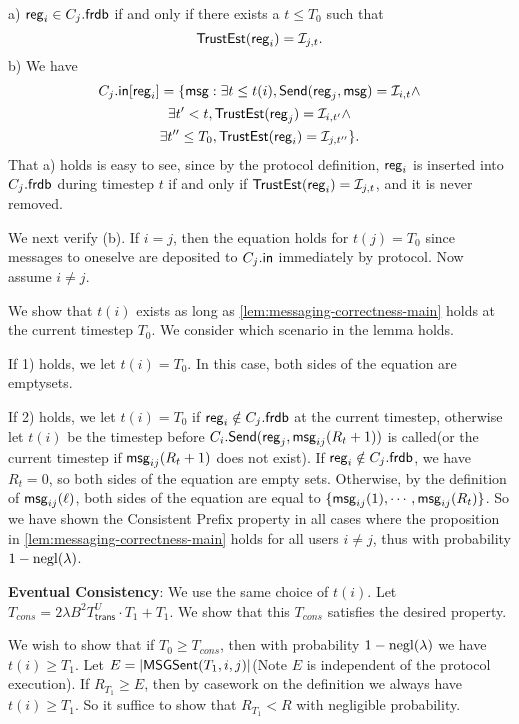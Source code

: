  a) $\mathsf{reg}_i \in C_j.\mathsf{frdb}$ if and only if there exists a $t \leq T_0$ such that 
 $$\mathsf{TrustEst}(\mathsf{reg}_i) = \mathcal{I}_{j, t}.$$
 b) We have
 \begin{multline*}
 C_j.\mathsf{in}[\mathsf{reg}_i] = \{\mathsf{msg}: \exists t \leq t(i), \mathsf{Send}(\mathsf{reg}_j, \mathsf{msg}) = \mathcal{I}_{i, t} \land \\
 \exists t' < t, \mathsf{TrustEst}(\mathsf{reg}_j) = \mathcal{I}_{i, t'} \land \\
 \exists t'' \leq T_0, \mathsf{TrustEst}(\mathsf{reg}_i) = \mathcal{I}_{j, t''}\}.   
 \end{multline*} 
 That a) holds is easy to see, since by the protocol definition, $\mathsf{reg}_i$ is inserted into $C_j.\mathsf{frdb}$ during timestep $t$ if and only if $\mathsf{TrustEst}(\mathsf{reg}_i) = \mathcal{I}_{j, t}$, and it is never removed. 
 
 We next verify (b). If $i = j$, then the equation holds for $t(j) = T_0$ since messages to oneselve are deposited to $C_j.\mathsf{in}$ immediately by protocol. Now assume $i \neq j.$ 
 
 We show that $t(i)$ exists as long as \cref{lem:messaging-correctness-main} holds at the current timestep $T_0$. We consider which scenario in the lemma holds. 
 
 If 1) holds, we let $t(i) = T_0$. In this case, both sides of the equation are emptysets.
 
 If 2) holds, we let $t(i) = T_0$ if $\mathsf{reg}_i \notin C_j.\mathsf{frdb}$ at the current timestep, otherwise let $t(i)$ be the timestep before $C_i.\mathsf{Send}(\mathsf{reg}_j, \mathsf{msg}_{ij}(R_{t} + 1))$ is called(or the current timestep if $\mathsf{msg}_{ij}(R_{t} + 1)$ does not exist). If $\mathsf{reg}_i \notin C_j.\mathsf{frdb}$, we have $R_t = 0$, so both sides of the equation are empty sets. Otherwise, by the definition of $\mathsf{msg}_{ij}(\ell)$, both sides of the equation are equal to $\{\mathsf{msg}_{ij}(1),\cdots, \mathsf{msg}_{ij}(R_t)\}$. So we have shown the Consistent Prefix property in all cases where the proposition in \cref{lem:messaging-correctness-main} holds for all users $i \neq j$, thus with probability $1 - \operatorname{negl}(\lambda)$.
 
 \textbf{Eventual Consistency}: We use the same choice of $t(i)$. Let $T_{cons} = 2\lambda B^2 T^U_{\mathsf{trans}} \cdot T_1 + T_1.$ We show that this $T_{cons}$ satisfies the desired property. 
 
 We wish to show that if $T_0 \geq T_{cons}$, then with probability $1 - \operatorname{negl}(\lambda)$ we have $t(i) \geq T_1$. Let $E = \left| \mathsf{MSGSent}(T_1, i, j) \right|$(Note $E$ is independent of the protocol execution). If $R_{T_1} \geq E$, then by casework on the definition we always have $t(i) \geq T_1$. So it suffice to show that $R_{T_1} < R$ with negligible probability. 
 
